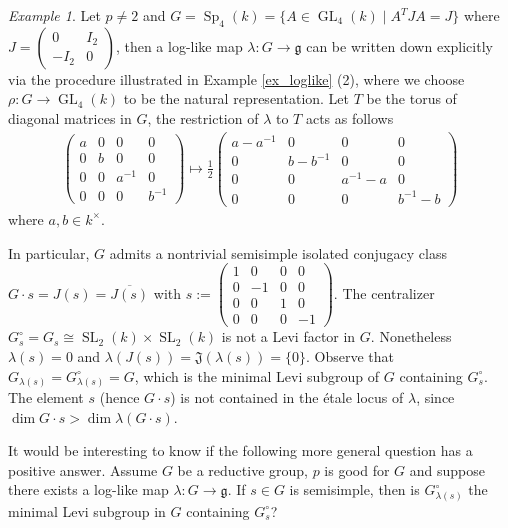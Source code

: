 \documentclass[12pt]{amsart}
\theoremstyle{definition}
\theoremstyle{remark}
\newtheorem{Example}[Theorem]{Example}
\newcommand{\g}{\mathfrak{g}}
\newcommand{\J}{\mathfrak{J}}
\newcommand{\GL}{\operatorname{GL}}
\newcommand{\SL}{\operatorname{SL}}
\newcommand{\Sp}{\operatorname{Sp}}
\begin{document}
\begin{Example}
Let $p \neq 2$ and  $G =\Sp_4(k) = \{ A \in \GL_4(k) \mid A^T J A = J \}$ where $J = \left( \begin{smallmatrix} 0 & I_2 \\ -I_2 & 0 \end{smallmatrix} \right)$, then a log-like map $\lambda \colon G  \to \g$ can be written down explicitly via the procedure illustrated in Example \ref{ex_loglike} (2), where we choose $\rho \colon G \to \GL_4(k)$ to be the natural representation.
Let $T$ be the  torus of diagonal matrices in $G$, the restriction of $\lambda$ to $T$ acts as follows
\begin{align*}
 \left( \begin{smallmatrix} a & 0 & 0 & 0 \\ 
0 & b & 0 & 0 \\ 
0 & 0 & a^{-1} & 0 \\ 
0 & 0 & 0 & b^{-1}  \end{smallmatrix} \right) \mapsto  
 \frac{1}{2} \left(
\begin{smallmatrix}a-a^{-1} & 0 & 0 & 0 \\ 
0 & b-b^{-1} & 0 & 0 \\ 
0 & 0 & a^{-1}-a & 0 \\ 
0 & 0 & 0 & b^{-1}-b  \end{smallmatrix} \right)
\end{align*}
where $a, b \in k^\times$.

In particular, $G$ admits a nontrivial semisimple isolated conjugacy class $G \cdot s = J(s) = \overline{J(s)}$ with $s := \left(
\begin{smallmatrix} 1 & 0 & 0 & 0 \\ 
0 & -1 & 0 & 0 \\ 
0 & 0 & 1 & 0 \\ 
0 & 0 & 0 & -1 \end{smallmatrix} \right)$.
The centralizer  $G_s^\circ = G_s \cong \SL_2(k) \times \SL_2(k)$ is not a Levi factor in $G$.
Nonetheless $\lambda(s) = 0$ and $\lambda(J(s)) = \J(\lambda(s)) = \{0\}$. Observe that $G_{\lambda(s)} = G_{\lambda(s)}^\circ = G$, which is the minimal Levi subgroup of $G$ containing $G_s^\circ$.
The  element $s$ (hence $G \cdot s$) is not contained in the \'etale locus of $\lambda$, since $\dim G \cdot s > \dim  \lambda(G \cdot s)$.
\end{Example}

It would be interesting to know if the following more general question has a positive answer.
Assume $G$ be a reductive group, $p$ is good for $G$ and suppose there exists a log-like map  $\lambda \colon G \to \g$.
If $s \in G$ is semisimple, then is $G_{\lambda(s)}^\circ$ the minimal Levi subgroup in $G$ containing $G_s^\circ$?
\end{document}
